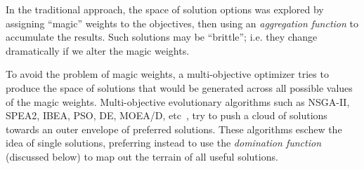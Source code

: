 \documentclass[10pt,journal,compsoc]{IEEEtran}
\newenvironment{changed}{\par}{\par}
\begin{document}
\begin{changed}
In the traditional approach, the space of solution options was explored by assigning ``magic'' weights to the objectives, then using an {\em aggregation function} to accumulate the results. 
Such solutions may be  ``brittle''; i.e. they change dramatically if we alter the magic weights.  

To avoid the problem of magic weights, a multi-objective optimizer tries to produce the space of solutions that would be generated across all possible values of the magic weights.
Multi-objective evolutionary algorithms such as NSGA-II, SPEA2, IBEA, PSO, DE, MOEA/D, etc~\cite{deb00afast,zit02,Zitzler04indicator-basedselection,Poli07particleswarm,585892,zhang07}, try to push a cloud of solutions towards an outer envelope of preferred solutions.
These algorithms eschew the idea of single solutions, preferring instead to use the {\em domination function} (discussed below) to map out the terrain of all useful solutions.
\end{changed}
 
\end{document}
